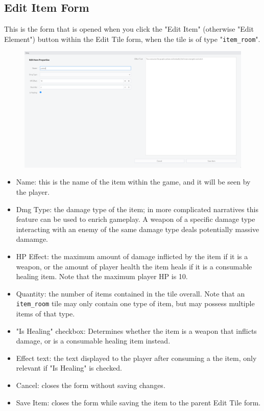 \documentclass{article} \usepackage[margin=1in,headheight=57pt,headsep=0.1in]{geometry}
\begin{document}
\subsection{Edit Item Form}
This is the form that is opened when you click the "Edit Item" (otherwise "Edit Element") button within the Edit Tile form, when the tile is of type "\texttt{item\_room}".
\begin{figure}[H]
	\centering
	\includegraphics[width=1.0\textwidth]{./editItemForm.png}
\end{figure}
\begin{itemize}
	\item Name: this is the name of the item within the game, and it will be seen by the player.
	\item Dmg Type: the damage type of the item; in more complicated narratives this feature can be used to enrich gameplay. A weapon of a specific damage type interacting with an enemy of the same damage type deals potentially massive damamge.
	\item HP Effect: the maximum amount of damage inflicted by the item if it is a weapon, or the amount of player health the item heals if it is a consumable healing item. Note that the maximum player HP is 10.
	\item Quantity: the number of items contained in the tile overall. Note that an \texttt{item\_room} tile may only contain one type of item, but may possess multiple items of that type.
	\item "Is Healing" checkbox: Determines whether the item is a weapon that inflicts damage, or is a consumable healing item instead.
	\item Effect text: the text displayed to the player after consuming a the item, only relevant if "Is Healing" is checked.
	\item Cancel: closes the form without saving changes.
	\item Save Item: closes the form while saving the item to the parent Edit Tile form.
\end{itemize}
\end{document}
